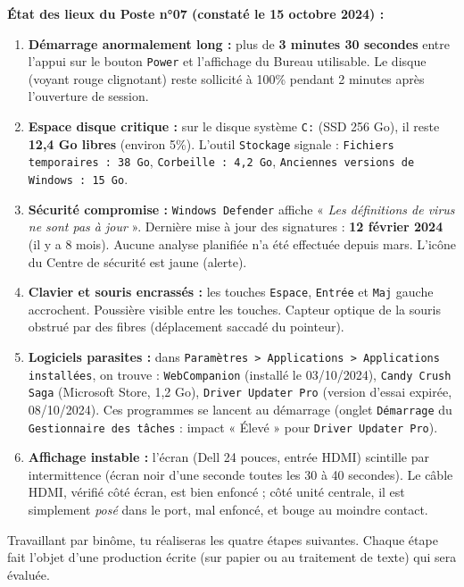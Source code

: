 \documentclass[11pt]{article}
\newcounter{popsec}
\newcounter{popsub}
\newcommand{\courssub}[1]{%
  \stepcounter{popsub}%
  \par\vspace{9pt}\noindent{\popxbold\fontsize{11.5}{13}\selectfont\color{popink}{\color{poporange}\thepopsec.\thepopsub}\hspace{6pt}#1}\par\nopagebreak\vspace{4pt}
}
\begin{document}
\textbf{État des lieux du Poste n°07 (constaté le 15 octobre 2024) :}
\begin{enumerate}
    \item \textbf{Démarrage anormalement long :} plus de \textbf{3 minutes 30 secondes} entre l'appui sur le bouton \texttt{Power} et l'affichage du Bureau utilisable. Le disque (voyant rouge clignotant) reste sollicité à 100\% pendant 2 minutes après l'ouverture de session.
    \item \textbf{Espace disque critique :} sur le disque système \texttt{C:} (SSD 256 Go), il reste \textbf{12,4 Go libres} (environ 5\%). L'outil \texttt{Stockage} signale : \texttt{Fichiers temporaires : 38 Go}, \texttt{Corbeille : 4,2 Go}, \texttt{Anciennes versions de Windows : 15 Go}.
    \item \textbf{Sécurité compromise :} \texttt{Windows Defender} affiche « \emph{Les définitions de virus ne sont pas à jour} ». Dernière mise à jour des signatures : \textbf{12 février 2024} (il y a 8 mois). Aucune analyse planifiée n'a été effectuée depuis mars. L'icône du Centre de sécurité est jaune (alerte).
    \item \textbf{Clavier et souris encrassés :} les touches \texttt{Espace}, \texttt{Entrée} et \texttt{Maj} gauche accrochent. Poussière visible entre les touches. Capteur optique de la souris obstrué par des fibres (déplacement saccadé du pointeur).
    \item \textbf{Logiciels parasites :} dans \texttt{Paramètres > Applications > Applications installées}, on trouve : \texttt{WebCompanion} (installé le 03/10/2024), \texttt{Candy Crush Saga} (Microsoft Store, 1,2 Go), \texttt{Driver Updater Pro} (version d'essai expirée, 08/10/2024). Ces programmes se lancent au démarrage (onglet \texttt{Démarrage} du \texttt{Gestionnaire des tâches} : impact « Élevé » pour \texttt{Driver Updater Pro}).
    \item \textbf{Affichage instable :} l'écran (Dell 24 pouces, entrée HDMI) scintille par intermittence (écran noir d'une seconde toutes les 30 à 40 secondes). Le câble HDMI, vérifié côté écran, est bien enfoncé ; côté unité centrale, il est simplement \emph{posé} dans le port, mal enfoncé, et bouge au moindre contact.
\end{enumerate}

\courssub{Consignes}
Travaillant par binôme, tu réaliseras les quatre étapes suivantes. Chaque étape fait l'objet d'une production écrite (sur papier ou au traitement de texte) qui sera évaluée.
\end{document}
